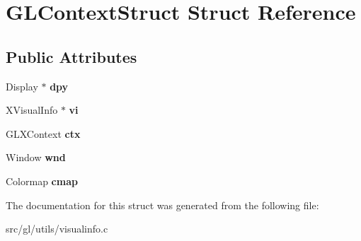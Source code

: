 \hypertarget{structGLContextStruct}{\section{G\-L\-Context\-Struct Struct Reference}
\label{structGLContextStruct}
}
\subsection*{Public Attributes}
\begin{DoxyCompactItemize}
\item 
\hypertarget{structGLContextStruct_a4740e9cec4473ab98a0bead1b0245d15}{Display $\ast$ {\bfseries dpy}}\label{structGLContextStruct_a4740e9cec4473ab98a0bead1b0245d15}

\item 
\hypertarget{structGLContextStruct_ab8436ee7e3e2fbabd21ffd051eda24e0}{X\-Visual\-Info $\ast$ {\bfseries vi}}\label{structGLContextStruct_ab8436ee7e3e2fbabd21ffd051eda24e0}

\item 
\hypertarget{structGLContextStruct_a57d6c9e8460fc914e21ef9dfa5178055}{G\-L\-X\-Context {\bfseries ctx}}\label{structGLContextStruct_a57d6c9e8460fc914e21ef9dfa5178055}

\item 
\hypertarget{structGLContextStruct_a9c9abd3d56d1751c1e79bd8f2f225d2e}{Window {\bfseries wnd}}\label{structGLContextStruct_a9c9abd3d56d1751c1e79bd8f2f225d2e}

\item 
\hypertarget{structGLContextStruct_a802b98c1b8ef3d2191dc6a41e1bbc786}{Colormap {\bfseries cmap}}\label{structGLContextStruct_a802b98c1b8ef3d2191dc6a41e1bbc786}

\end{DoxyCompactItemize}


The documentation for this struct was generated from the following file\-:\begin{DoxyCompactItemize}
\item 
src/gl/utils/visualinfo.\-c\end{DoxyCompactItemize}
